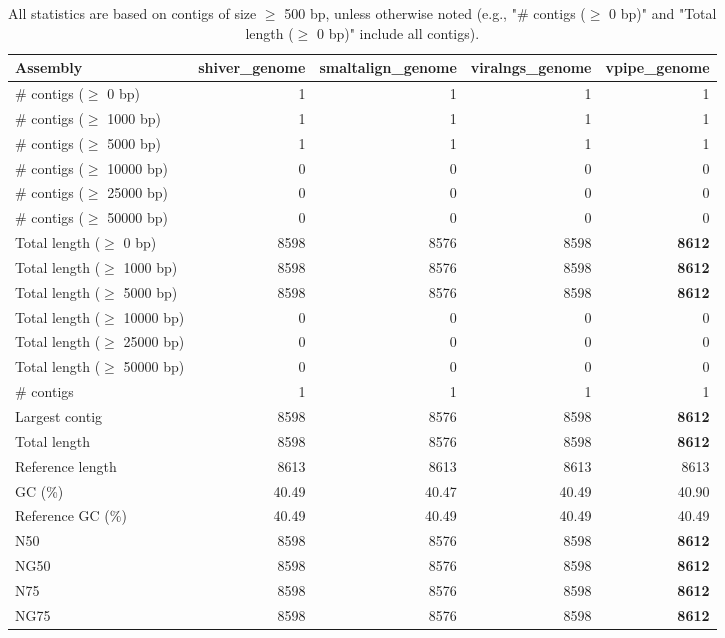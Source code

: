 \documentclass[12pt,a4paper]{article}
\begin{document}
\begin{table}[ht]
\begin{center}
\caption{All statistics are based on contigs of size $\geq$ 500 bp, unless otherwise noted (e.g., "\# contigs ($\geq$ 0 bp)" and "Total length ($\geq$ 0 bp)" include all contigs).}
\begin{tabular}{|l*{4}{|r}|}
\hline
Assembly & shiver\_genome & smaltalign\_genome & viralngs\_genome & vpipe\_genome \\ \hline
\# contigs ($\geq$ 0 bp) & 1 & 1 & 1 & 1 \\ \hline
\# contigs ($\geq$ 1000 bp) & 1 & 1 & 1 & 1 \\ \hline
\# contigs ($\geq$ 5000 bp) & 1 & 1 & 1 & 1 \\ \hline
\# contigs ($\geq$ 10000 bp) & 0 & 0 & 0 & 0 \\ \hline
\# contigs ($\geq$ 25000 bp) & 0 & 0 & 0 & 0 \\ \hline
\# contigs ($\geq$ 50000 bp) & 0 & 0 & 0 & 0 \\ \hline
Total length ($\geq$ 0 bp) & 8598 & 8576 & 8598 & {\bf 8612} \\ \hline
Total length ($\geq$ 1000 bp) & 8598 & 8576 & 8598 & {\bf 8612} \\ \hline
Total length ($\geq$ 5000 bp) & 8598 & 8576 & 8598 & {\bf 8612} \\ \hline
Total length ($\geq$ 10000 bp) & 0 & 0 & 0 & 0 \\ \hline
Total length ($\geq$ 25000 bp) & 0 & 0 & 0 & 0 \\ \hline
Total length ($\geq$ 50000 bp) & 0 & 0 & 0 & 0 \\ \hline
\# contigs & 1 & 1 & 1 & 1 \\ \hline
Largest contig & 8598 & 8576 & 8598 & {\bf 8612} \\ \hline
Total length & 8598 & 8576 & 8598 & {\bf 8612} \\ \hline
Reference length & 8613 & 8613 & 8613 & 8613 \\ \hline
GC (\%) & 40.49 & 40.47 & 40.49 & 40.90 \\ \hline
Reference GC (\%) & 40.49 & 40.49 & 40.49 & 40.49 \\ \hline
N50 & 8598 & 8576 & 8598 & {\bf 8612} \\ \hline
NG50 & 8598 & 8576 & 8598 & {\bf 8612} \\ \hline
N75 & 8598 & 8576 & 8598 & {\bf 8612} \\ \hline
NG75 & 8598 & 8576 & 8598 & {\bf 8612} \\ \hline

\end{tabular}
\end{center}
\end{table}
\end{document}
